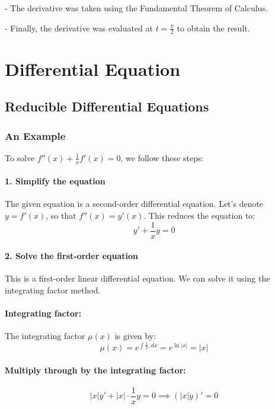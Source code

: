 \documentclass[a4paper,12pt]{book}
\begin{document}
- The derivative was taken using the Fundamental Theorem of Calculus.

- Finally, the derivative was evaluated at \(t = \frac{\pi}{2}\) to obtain the result.

\chapter{Differential Equation}

\section{Reducible Differential Equations}

\subsection{An Example}

To solve \( f''(x) + \frac{1}{x} f'(x) = 0 \), we follow these steps:

\subsubsection{1. Simplify the equation}

The given equation is a second-order differential equation. Let's denote \( y = f'(x) \), so that \( f''(x) = y'(x) \). This reduces the equation to:
\[
y' + \frac{1}{x} y = 0
\]

\subsubsection{2. Solve the first-order equation}

This is a first-order linear differential equation. We can solve it using the integrating factor method.

\subsubsection{Integrating factor:}

The integrating factor \( \mu(x) \) is given by:
\[
\mu(x) = e^{\int \frac{1}{x} , dx} = e^{\ln|x|} = |x|
\]

\subsubsection{Multiply through by the integrating factor:}

\[
|x| y' + |x| \cdot \frac{1}{x} y = 0 \implies (|x| y)' = 0
\]
\end{document}
